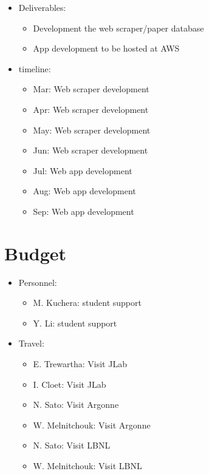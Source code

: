 \documentclass{article}[12pt,preprint]
\begin{document}
\begin{itemize}

\item Deliverables:

  \begin{itemize}
  \item Development the web scraper/paper database
  \item App development to be hosted at AWS
  \end{itemize}

\item timeline:

  \begin{itemize}
  \item Mar: Web scraper development 
  \item Apr: Web scraper development 
  \item May: Web scraper development 
  \item Jun: Web scraper development 
  \item Jul: Web app development
  \item Aug: Web app development
  \item Sep: Web app development
  \end{itemize}

\end{itemize}


\newpage
\section{Budget}

\begin{itemize}

\item Personnel:

  \begin{itemize}
  \item M. Kuchera: student support
  \item Y. Li: student support
  \end{itemize}

\item Travel:

  \begin{itemize}
  \item E. Trewartha:  Visit JLab
  \item I. Cloet: Visit JLab
  \item N. Sato:  Visit Argonne 
  \item W. Melnitchouk: Visit Argonne 
  \item N. Sato:  Visit LBNL 
  \item W. Melnitchouk: Visit LBNL
  \end{itemize}

\end{itemize}
\end{document}
